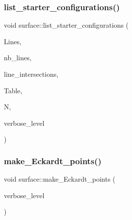 \mbox{\label{classsurface_a55328e9de25d908fa823cc78633fdda1}} 
\subsubsection{\texorpdfstring{list\+\_\+starter\+\_\+configurations()}{list\_starter\_configurations()}}
{\footnotesize\ttfamily void surface\+::list\+\_\+starter\+\_\+configurations (\begin{DoxyParamCaption}\item[{\mbox{\hyperlink{galois_8h_a09fddde158a3a20bd2dcadb609de11dc}{I\+NT}} $\ast$}]{Lines,  }\item[{\mbox{\hyperlink{galois_8h_a09fddde158a3a20bd2dcadb609de11dc}{I\+NT}}}]{nb\+\_\+lines,  }\item[{\mbox{\hyperlink{classset__of__sets}{set\+\_\+of\+\_\+sets}} $\ast$}]{line\+\_\+intersections,  }\item[{\mbox{\hyperlink{galois_8h_a09fddde158a3a20bd2dcadb609de11dc}{I\+NT}} $\ast$\&}]{Table,  }\item[{\mbox{\hyperlink{galois_8h_a09fddde158a3a20bd2dcadb609de11dc}{I\+NT}} \&}]{N,  }\item[{\mbox{\hyperlink{galois_8h_a09fddde158a3a20bd2dcadb609de11dc}{I\+NT}}}]{verbose\+\_\+level }\end{DoxyParamCaption})}

\mbox{\label{classsurface_a12becb7be3c15fbff264368f79bd2f1b}} 
\subsubsection{\texorpdfstring{make\+\_\+\+Eckardt\+\_\+points()}{make\_Eckardt\_points()}}
{\footnotesize\ttfamily void surface\+::make\+\_\+\+Eckardt\+\_\+points (\begin{DoxyParamCaption}\item[{\mbox{\hyperlink{galois_8h_a09fddde158a3a20bd2dcadb609de11dc}{I\+NT}}}]{verbose\+\_\+level }\end{DoxyParamCaption})}

